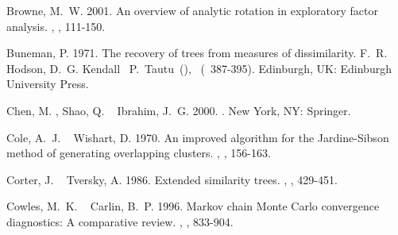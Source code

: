 \documentclass[11pt]{article}
\begin{document}
\begin{thebibliography}{}
%
%
Browne, M.~W.%
%
\newblock{}\BBOP{}2001\BBCP{}.
\newblock{}\BBOQ{}An overview of analytic rotation in exploratory factor
  analysis.\BBCQ{}
\newblock{}, , 111-150.

%
%
Buneman, P.%
%
\newblock{}\BBOP{}1971\BBCP{}.
\newblock{}\BBOQ{}The recovery of trees from measures of dissimilarity.\BBCQ{}
\newblock{}\BIn{} F.~R. Hodson, D.~G. Kendall\BCBL{}\ \BBA{} P.~Tautu\ (\BEDS),
  \ (\BPG\
  387-395).
\newblock{}Edinburgh, UK: Edinburgh University Press.

%
%
Chen, M.%
, Shao, Q.%
\BCBL{}\ \BBA{} Ibrahim, J.~G.%
%
\newblock{}\BBOP{}2000\BBCP{}.
\newblock{}.
\newblock{}New York, NY: Springer.

%
%
Cole, A.~J.%
\BCBT{}\ \BBA{} Wishart, D.%
%
\newblock{}\BBOP{}1970\BBCP{}.
\newblock{}\BBOQ{}An improved algorithm for the {J}ardine-{S}ibson method of
  generating overlapping clusters.\BBCQ{}
\newblock{}, , 156-163.

%
%
Corter, J.%
\BCBT{}\ \BBA{} Tversky, A.%
%
\newblock{}\BBOP{}1986\BBCP{}.
\newblock{}\BBOQ{}Extended similarity trees.\BBCQ{}
\newblock{}, , 429-451.

%
%
Cowles, M.~K.%
\BCBT{}\ \BBA{} Carlin, B.~P.%
%
\newblock{}\BBOP{}1996\BBCP{}.
\newblock{}\BBOQ{}Markov chain {M}onte {C}arlo convergence diagnostics: {A}
  comparative review.\BBCQ{}
\newblock{}, ,
  833-904.


\end{thebibliography}
\end{document}
